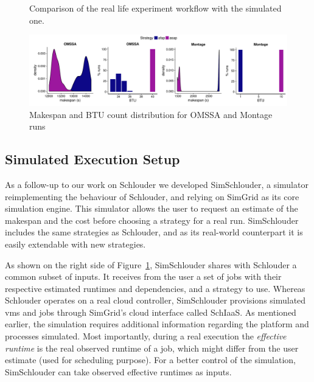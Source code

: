 \documentclass[10pt,conference,compsocconf]{IEEEtran}
\begin{document}
\begin{figure}
	\resizebox{0.5\textwidth}{!}{%
		
		
	}%
	\caption{Comparison of the real life experiment workflow with the
	simulated one.}\label{fig:rs}
\end{figure}
\begin{figure}
	\centering
	\includegraphics[width=\textwidth]{gfx/real_plot.pdf}
	\caption{Makespan and BTU count distribution for OMSSA and Montage
	runs\label{fig:realbrs}}
\end{figure}

\subsection{Simulated Execution Setup}
As a follow-up  to our work on Schlouder we  developed SimSchlouder, a simulator
reimplementing the  behaviour of Schlouder, and  relying on SimGrid as  its core
simulation engine.  This simulator allows the user to request an estimate of the
makespan and  the cost before choosing  a strategy for a  real run. SimSchlouder
includes the same strategies as Schlouder,  and as its real-world counterpart it
is easily extendable with new strategies. 

As  shown on  the right  side of  Figure~\ref{fig:rs}, SimSchlouder  shares with
Schlouder a common  subset of inputs.  It  receives from the user a  set of jobs
with their  respective estimated  runtimes and dependencies,  and a  strategy to
use.  Whereas  Schlouder  operates  on a  real  cloud  controller,  SimSchlouder
provisions simulated \acp{vm} and jobs  through SimGrid's cloud interface called
SchIaaS. As  mentioned earlier,  the simulation requires  additional information
regarding the platform and processes simulated.
Most importantly, during a real execution  the \emph{effective runtime} is the
real observed runtime of a job, which might differ from the user estimate (used 
for scheduling purpose). For a better control of the simulation, SimSchlouder
can take observed effective runtimes as inputs. 
\end{document}
